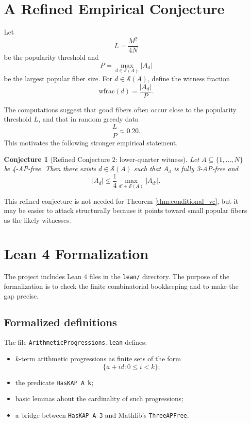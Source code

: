\documentclass[11pt]{article}
\newtheorem{conjecture}[theorem]{Conjecture}
\newcommand{\calS}{\mathcal{S}}
\begin{document}
\section{A Refined Empirical Conjecture}

Let
\[
  L=\frac{M^2}{4N}
\]
be the popularity threshold and
\[
  P=\max_{d\in\calS(A)} |A_d|
\]
be the largest popular fiber size.  For \(d\in\calS(A)\), define the witness
fraction
\[
  \mathrm{wfrac}(d)=\frac{|A_d|}{P}.
\]

The computations suggest that good fibers often occur close to the popularity
threshold \(L\), and that in random greedy data
\[
  \frac{L}{P}\approx 0.20.
\]
This motivates the following stronger empirical statement.

\begin{conjecture}[Refined Conjecture 2: lower-quarter witness]
Let \(A\subseteq\{1,\ldots,N\}\) be 4-AP-free.  Then there exists
\(d\in\calS(A)\) such that \(A_d\) is fully 3-AP-free and
\[
  |A_d|\leq \frac14 \max_{d'\in\calS(A)} |A_{d'}|.
\]
\end{conjecture}

This refined conjecture is not needed for Theorem \ref{thm:conditional_vc}, but
it may be easier to attack structurally because it points toward small popular
fibers as the likely witnesses.

\section{Lean 4 Formalization}

The project includes Lean 4 files in the \texttt{lean/} directory.  The purpose
of the formalization is to check the finite combinatorial bookkeeping and to
make the gap precise.

\subsection{Formalized definitions}

The file \texttt{ArithmeticProgressions.lean} defines:
\begin{itemize}
  \item \(k\)-term arithmetic progressions as finite sets of the form
  \[
    \{a+i d:0\leq i<k\};
  \]
  \item the predicate \texttt{HasKAP A k};
  \item basic lemmas about the cardinality of such progressions;
  \item a bridge between \texttt{HasKAP A 3} and Mathlib's
  \texttt{ThreeAPFree}.
\end{itemize}
\end{document}
